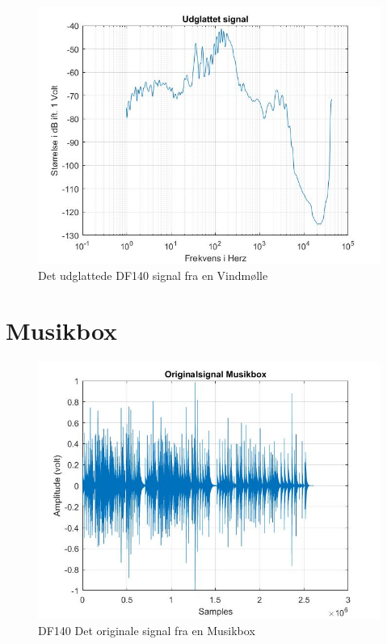 \begin{figure}[H]
	\centering
	\includegraphics[width=140mm]{figures/Vind/udglattet.jpg}
	\caption{Det udglattede DF140 signal fra en Vindmølle}
	\label{fig:Vind udglattet}
\end{figure}


\section{Musikbox}
\begin{figure}[H]
	\centering
	\includegraphics[width=140mm]{figures/Musikbox/original.jpg}
	\caption{DF140 Det originale signal fra en Musikbox}
	\label{fig:Musikbox original}
\end{figure}

